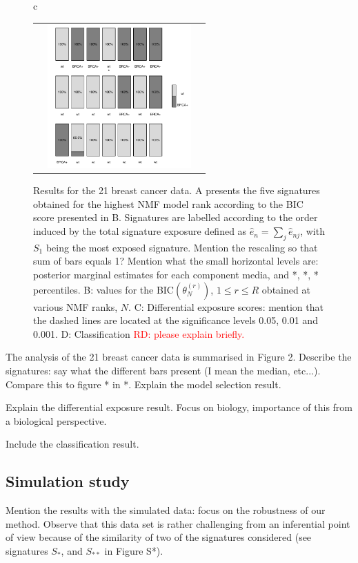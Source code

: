 \documentclass{bioinfo}
\begin{document}
\begin{figure}
\begin{tabular}{c}
\begin{tabular}{ccc}
   &
     \includegraphics[width=5.5cm]{figs/Classific_result_with_Opp_5b}
   \end{tabular}
 \end{tabular}
 \caption{\textrm{%
     Results for the 21 breast cancer data. A presents the five
    signatures obtained for the highest NMF model rank according to the
BIC score presented in B. Signatures are labelled according to the
order induced by the total signature exposure defined as $\hat e_n =
\sum_{j} \hat e_{nj}$, with $S_1$ being the most exposed
signature. Mention the rescaling so that sum of bars equals 1?
Mention what the small horizontal levels are: posterior marginal
estimates for each component media, and *, *, * percentiles. B: values
for the BIC$(\theta^{(r)}_N)$, $1 \leq r \leq R$ obtained at various
NMF ranks, $N$. C: Differential exposure scores: mention that the
dashed lines are located at the significance levels 0.05, 0.01 and
0.001. D: Classification \textcolor{red}{RD: please explain briefly.}
  }
 }\label{fig:bcancer} 
\end{figure} 

The analysis of the 21 breast cancer data is summarised in
Figure 2. Describe the signatures: say what the different
bars present (I mean the median, etc...). Compare this to figure * in
*. Explain the model selection result.
 
Explain the differential exposure result. Focus on biology, importance
of this from a biological perspective.

Include the classification result.

\subsection{Simulation study}
Mention the results with the simulated data: focus on the robustness
of our method. Observe that this data set is rather challenging from
an inferential point of view because of the similarity of two of the 
 signatures considered (see signatures $S_*$, and $S_{**}$ in Figure
 S*).
\end{document}
